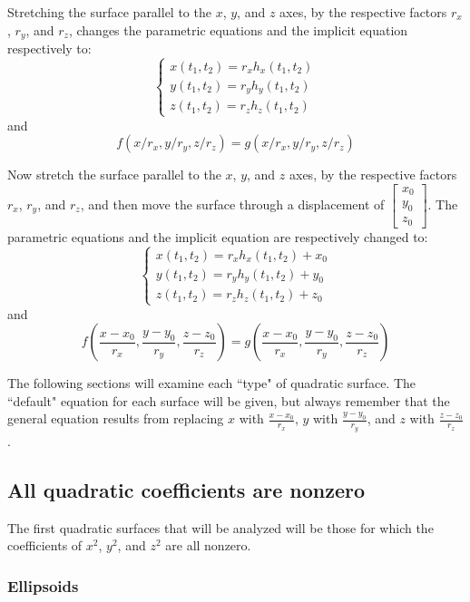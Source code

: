 \documentclass{article}
\begin{document}
\vspace{5mm}

Stretching the surface parallel to the \(x\), \(y\), and \(z\) axes, by the respective factors \(r_x\), \(r_y\), and \(r_z\), changes the parametric equations and the implicit equation respectively to:
\[\left\{\begin{array}{c} x(t_1, t_2) = r_x h_x(t_1, t_2) \\ y(t_1, t_2) = r_y h_y(t_1, t_2) \\ z(t_1, t_2) = r_z h_z(t_1, t_2) \end{array}\right.\]
and 
\[f(x/r_x, y/r_y, z/r_z) = g(x/r_x, y/r_y, z/r_z)\]

\vspace{5mm}

Now stretch the surface parallel to the \(x\), \(y\), and \(z\) axes, by the respective factors \(r_x\), \(r_y\), and \(r_z\), and then move the surface through a displacement of \(\begin{bmatrix} x_0 \\ y_0 \\ z_0 \end{bmatrix}\). The parametric equations and the implicit equation are respectively changed to:
\[\left\{\begin{array}{c} x(t_1, t_2) = r_x h_x(t_1, t_2) + x_0 \\ y(t_1, t_2) = r_y h_y(t_1, t_2) + y_0 \\ z(t_1, t_2) = r_z h_z(t_1, t_2) + z_0 \end{array}\right.\]
and 
\[f\left(\frac{x - x_0}{r_x}, \frac{y - y_0}{r_y}, \frac{z - z_0}{r_z}\right) = g\left(\frac{x - x_0}{r_x}, \frac{y - y_0}{r_y}, \frac{z - z_0}{r_z}\right)\]


The following sections will examine each ``type" of quadratic surface. The ``default" equation for each surface will be given, but always remember that the general equation results from replacing \(x\) with \(\frac{x - x_0}{r_x}\), \(y\) with \(\frac{y - y_0}{r_y}\), and \(z\) with \(\frac{z - z_0}{r_z}\). 


\subsection*{All quadratic coefficients are nonzero}

The first quadratic surfaces that will be analyzed will be those for which the coefficients of \(x^2\), \(y^2\), and \(z^2\) are all nonzero.

\subsubsection*{Ellipsoids} 
\end{document}
